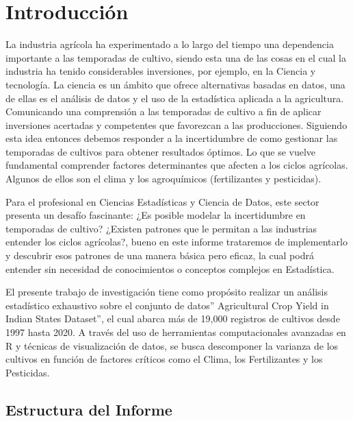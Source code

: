 \documentclass[oneside,11pt]{Latex/Classes/PhDthesisPSnPDF}
\begin{document}
  \cleardoublepage

\mainmatter
\def\baselinestretch{1.5}

\chapter*{Introducción}

La industria agrícola ha experimentado a lo largo del tiempo una
dependencia importante a las temporadas de cultivo, siendo esta una de
las cosas en el cual la industria ha tenido considerables inversiones,
por ejemplo, en la Ciencia y tecnología. La ciencia es un ámbito que
ofrece alternativas basadas en datos, una de ellas es el análisis de
datos y el uso de la estadística aplicada a la agricultura. Comunicando
una comprensión a las temporadas de cultivo a fin de aplicar inversiones
acertadas y competentes que favorezcan a las producciones. Siguiendo
esta idea entonces debemos responder a la incertidumbre de como
gestionar las temporadas de cultivos para obtener resultados óptimos. Lo
que se vuelve fundamental comprender factores determinantes que afecten
a los ciclos agrícolas. Algunos de ellos son el clima y los agroquímicos
(fertilizantes y pesticidas).

Para el profesional en Ciencias Estadísticas y Ciencia de Datos, este
sector presenta un desafío fascinante: ¿Es posible modelar la
incertidumbre en temporadas de cultivo? ¿Existen patrones que le
permitan a las industrias entender los ciclos agrícolas?, bueno en este
informe trataremos de implementarlo y descubrir esos patrones de una
manera básica pero eficaz, la cual podrá entender sin necesidad de
conocimientos o conceptos complejos en Estadística.

El presente trabajo de investigación tiene como propósito realizar un
análisis estadístico exhaustivo sobre el conjunto de datos''
Agricultural Crop Yield in Indian States Dataset'', el cual abarca más
de 19,000 registros de cultivos desde 1997 hasta 2020. A través del uso
de herramientas computacionales avanzadas en R y técnicas de
visualización de datos, se busca descomponer la varianza de los cultivos
en función de factores críticos como el Clima, los Fertilizantes y los
Pesticidas.

\section*{Estructura del Informe}
\end{document}
